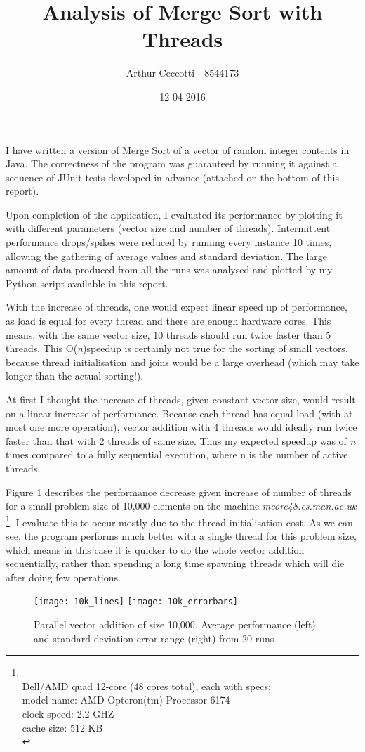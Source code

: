 \documentclass{article}
\title{Analysis of Merge Sort with Threads}
\date{12-04-2016}
\author{Arthur Ceccotti - 8544173}
\begin{document}
  \maketitle
  I have written a version of Merge Sort of a vector of random integer contents in Java. The correctness of the program was guaranteed by running it against a sequence of JUnit tests developed in advance (attached on the bottom of this report).

  Upon completion of the application, I evaluated its performance by plotting it with different parameters (vector size and number of threads). Intermittent performance drops/spikes were reduced by running every instance 10 times, allowing the gathering of average values and standard deviation. The large amount of data produced from all the runs was analysed and plotted by my Python script available in this report. 

  With the increase of threads, one would expect linear speed up of performance, as load is equal for every thread and there are enough hardware cores. This means, with the same vector size, 10 threads should run twice faster than 5 threads. This O(\textit{n})speedup is certainly not true for the sorting of small vectors, because thread initialisation and joins would be a large overhead (which may take longer than the actual sorting!).


  At first I thought the increase of threads, given constant vector size, would result on a linear increase of performance. Because each thread has equal load (with at most one more operation), vector addition with 4 threads would ideally run twice faster than that with 2 threads of same size. Thus my expected speedup was of \textit{n} times compared to a fully sequential execution, where n is the number of active threads.



  Figure 1 describes the performance decrease given increase of number of threads for a small problem size of 10,000 elements on the machine \textit{mcore48.cs.man.ac.uk}  \footnote{\label{machinespecs} \\
  Dell/AMD quad 12-core (48 cores total), each with specs:\\
  model name: AMD Opteron(tm) Processor 6174 \\
  clock speed: 2.2 GHZ \\
  cache size: 512 KB \\}. I evaluate this to occur mostly due to the thread initialisation cost. As we can see, the program performs much better with a single thread for this problem size, which means in this case it is quicker to do the whole vector addition sequentially, rather than spending a long time spawning threads which will die after doing few operations.
\newpage
\begin{figure}[t]
\centerline{%
\texttt{[image: 10k\_lines]}%
\texttt{[image: 10k\_errorbars]}%
}%
\caption{Parallel vector addition of size 10,000. Average performance (left) and standard deviation error range (right) from 20 runs}
\end{figure}
  
\end{document}
